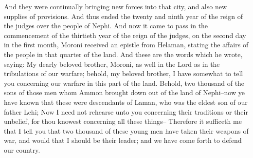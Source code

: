 \bverse \iffalse And they were continually bringing new forces into that city, and also new supplies of provisions. \fi
And they were continually bringing new forces into that city, and also new supplies of provisions.
\bverse \iffalse And thus ended the twenty and ninth year of the reign of the judges over the people of Nephi. \fi
And thus ended the twenty and ninth year of the reign of the judges over the people of Nephi.
\bchapter
\bverse \iffalse And now it came to pass in the commencement of the thirtieth year of the reign of the judges, on the second day in the first month, Moroni received an epistle from Helaman, stating the affairs of the people in that quarter of the land. \fi
And now it came to pass in the commencement of the thirtieth year of the reign of the judges, on the second day in the first month, Moroni received an epistle from Helaman, stating the affairs of the people in that quarter of the land.
\bverse \iffalse And these are the words which he wrote, saying: My dearly beloved brother, Moroni, as well in the Lord as in the tribulations of our warfare; behold, my beloved brother, I have somewhat to tell you concerning our warfare in this part of the land. \fi
And these are the words which he wrote, saying: My dearly beloved brother, Moroni, as well in the Lord as in the tribulations of our warfare; behold, my beloved brother, I have somewhat to tell you concerning our warfare in this part of the land.
\bverse \iffalse Behold, two thousand of the sons of those men whom Ammon brought down out of the land of Nephi--now ye have known that these were descendants of Laman, who was the eldest son of our father Lehi; \fi
Behold, two thousand of the sons of those men whom Ammon brought down out of the land of Nephi--now ye have known that these were descendants of Laman, who was the eldest son of our father Lehi;
\bverse \iffalse Now I need not rehearse unto you concerning their traditions or their unbelief, for thou knowest concerning all these things-- \fi
Now I need not rehearse unto you concerning their traditions or their unbelief, for thou knowest concerning all these things--
\bverse \iffalse Therefore it sufficeth me that I tell you that two thousand of these young men have taken their weapons of war, and would that I should be their leader; and we have come forth to defend our country. \fi
Therefore it sufficeth me that I tell you that two thousand of these young men have taken their weapons of war, and would that I should be their leader; and we have come forth to defend our country.
